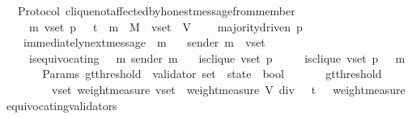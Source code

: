 \begin{isabellebody}
%
\endisatagproof
{\isafoldproof}%
%
\isadelimproof
\isanewline
%
\endisadelimproof
\isanewline
\isanewline
{}\isamarkupfalse%
\ {\isacharparenleft}\ Protocol{\isacharparenright}\ clique{\isacharunderscore}not{\isacharunderscore}affected{\isacharunderscore}by{\isacharunderscore}honest{\isacharunderscore}message{\isacharunderscore}from{\isacharunderscore}member\ {\isacharcolon}\isanewline
\ \ {\isachardoublequoteopen}{\isasymforall}\ {\isasymsigma}\ m\ v{\isacharunderscore}set\ p{\isachardot}\ {\isasymsigma}\ {\isasymin}\ {\isasymSigma}t\ {\isasymand}\ m\ {\isasymin}\ M\ {\isasymand}\ v{\isacharunderscore}set\ {\isasymsubseteq}\ V\ \isanewline
\ \ {\isasymlongrightarrow}\ majority{\isacharunderscore}driven\ p\isanewline
\ \ {\isasymlongrightarrow}\ immediately{\isacharunderscore}next{\isacharunderscore}message\ {\isacharparenleft}{\isasymsigma}{\isacharcomma}\ m{\isacharparenright}\isanewline
\ \ {\isasymlongrightarrow}\ sender\ m\ {\isasymin}\ v{\isacharunderscore}set\isanewline
\ \ {\isasymlongrightarrow}\ {\isasymnot}\ is{\isacharunderscore}equivocating\ {\isacharparenleft}{\isasymsigma}\ {\isasymunion}\ {\isacharbraceleft}m{\isacharbraceright}{\isacharparenright}\ {\isacharparenleft}sender\ m{\isacharparenright}\isanewline
\ \ {\isasymlongrightarrow}\ is{\isacharunderscore}clique\ {\isacharparenleft}v{\isacharunderscore}set{\isacharcomma}\ p{\isacharcomma}\ {\isasymsigma}{\isacharparenright}\ \isanewline
\ \ {\isasymlongrightarrow}\ is{\isacharunderscore}clique\ {\isacharparenleft}v{\isacharunderscore}set{\isacharcomma}\ p{\isacharcomma}\ {\isasymsigma}\ {\isasymunion}\ {\isacharbraceleft}m{\isacharbraceright}{\isacharparenright}{\isachardoublequoteclose}\isanewline
%
\isadelimproof
\ \ %
\endisadelimproof
%
\isatagproof
{}\isamarkupfalse%
%
\endisatagproof
{\isafoldproof}%
%
\isadelimproof
\isanewline
%
\endisadelimproof
\isanewline
\isanewline
\isanewline
\isanewline
\isanewline
\ \isanewline
{}\isamarkupfalse%
\ {\isacharparenleft}\ Params{\isacharparenright}\ gt{\isacharunderscore}threshold\ {\isacharcolon}{\isacharcolon}\ {\isachardoublequoteopen}{\isacharparenleft}validator\ set\ {\isacharasterisk}\ state{\isacharparenright}\ {\isasymRightarrow}\ bool{\isachardoublequoteclose}\isanewline
\ \ \isanewline
\ \ \ \ {\isachardoublequoteopen}gt{\isacharunderscore}threshold\ \isanewline
\ \ \ \ \ \ \ {\isacharequal}\ {\isacharparenleft}{\isasymlambda}{\isacharparenleft}v{\isacharunderscore}set{\isacharcomma}\ {\isasymsigma}{\isacharparenright}{\isachardot}{\isacharparenleft}weight{\isacharunderscore}measure\ v{\isacharunderscore}set\ {\isachargreater}\ {\isacharparenleft}weight{\isacharunderscore}measure\ V{\isacharparenright}\ div\ {}\ {\isacharplus}\ t\ \ {\isacharminus}\ weight{\isacharunderscore}measure\ {\isacharparenleft}equivocating{\isacharunderscore}validators\ {\isasymsigma}{\isacharparenright}{\isacharparenright}{\isacharparenright}{\isachardoublequoteclose}\isanewline

\end{isabellebody}
